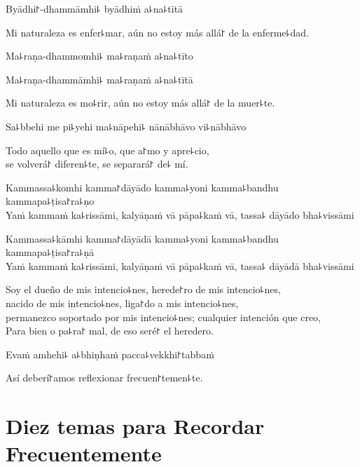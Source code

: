 %
Byādhi꜓-dhammāmhi꜕ byādhiṁ a꜕na꜕tītā

\begin{english}
  Mi naturaleza es enfer꜕mar, aún no estoy más allá꜓ de la enferme꜕dad.
\end{english}

%
Ma꜕raṇa-dhammomhi꜕ ma꜕raṇaṁ a꜕na꜕tīto

%
Ma꜕raṇa-dhammāmhi꜕ ma꜕raṇaṁ a꜕na꜕tītā

\begin{english}
  Mi naturaleza es mo꜕rir, aún no estoy más allá꜓ de la muer꜕te.
\end{english}

Sa꜕bbehi me pi꜕yehi ma꜕nāpehi꜕ nānābhāvo vi꜕nābhāvo

\begin{english}
  Todo aquello que es mí꜕o, que a꜓mo y apre꜕cio,\\
  se volverá꜓ diferen꜕te, se separará꜓ de꜕ mí.
\end{english}

%
Kammassa꜕komhi kamma꜓dāyādo kamma꜕yoni kamma꜕bandhu kammapa꜕ṭisa꜓ra꜕ṇo\\
Yaṁ kammaṁ ka꜕rissāmi, kalyāṇaṁ vā pāpa꜕kaṁ vā, tassa꜕ dāyādo bha꜕vissāmi

\clearpage

%
Kammassa꜕kāmhi kamma꜓dāyādā kamma꜕yoni kamma꜕bandhu kammapa꜕ṭisa꜓ra꜕ṇā\\
Yaṁ kammaṁ ka꜕rissāmi, kalyāṇaṁ vā pāpa꜕kaṁ vā, tassa꜕ dāyādā bha꜕vissāmi

\begin{english}
  Soy el dueño de mis intencio꜕nes, herede꜓ro de mis intencio꜕nes, \\
  nacido de mis intencio꜕nes, liga꜓do a mis intencio꜕nes,\\
  permanezco soportado por mis intencio꜕nes; cualquier intención que creo, \\
  Para bien o pa꜕ra꜓ mal, de eso seré꜓ el heredero.
\end{english}

Evaṁ amhehi꜕ a꜕bhiṇhaṁ pacca꜕vekkhi꜓tabbaṁ

\begin{english}
  Así deberí꜓amos reflexionar frecuen꜓temen꜕te.
\end{english}

\chapter[Diez temas]{Diez temas para Recordar Frecuentemente}

